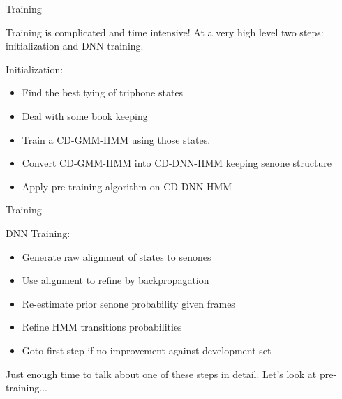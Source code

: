 \documentclass[notes]{beamer}
\begin{document}
\begin{frame}{Training}
	\begin{center}
		Training is complicated and time intensive! At a very high level two steps: initialization and DNN training.
	\end{center}
	
	\vfill
	
	Initialization:
	\begin{itemize}
		\item Find the best tying of triphone states
		\item Deal with some book keeping
		\item Train a CD-GMM-HMM using those states.
		\item Convert CD-GMM-HMM into CD-DNN-HMM keeping senone structure
		\item Apply pre-training algorithm on CD-DNN-HMM
	\end{itemize}

	\vfill	

\end{frame}

\begin{frame}{Training}

\vfill

DNN Training:

\begin{itemize}
	\item Generate raw alignment of states to senones
	\item Use alignment to refine by backpropagation
	\item Re-estimate prior senone probability given frames
	\item Refine HMM transitions probabilities
	\item Goto first step if no improvement against development set
\end{itemize}

\vfill

\vfill

\begin{center}
Just enough time to talk about one of these steps in detail. Let's look at pre-training...
\end{center}

\vfill


\end{frame}
\end{document}
